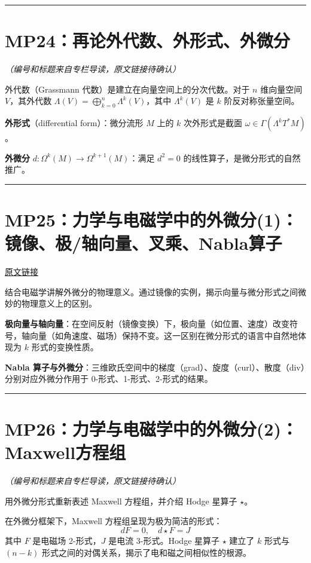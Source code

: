 \documentclass[10pt, openany]{book}
\begin{document}
\medskip
\noindent\rule{\textwidth}{0.4pt}

\section{MP24：再论外代数、外形式、外微分}
\label{sec:mp24}

\textit{（编号和标题来自专栏导读，原文链接待确认）}

外代数（Grassmann 代数）是建立在向量空间上的分次代数。对于 $n$ 维向量空间 $V$，其外代数 $\Lambda(V) = \bigoplus_{k=0}^n \Lambda^k(V)$，其中 $\Lambda^k(V)$ 是 $k$ 阶反对称张量空间。

\textbf{外形式}（differential form）：微分流形 $M$ 上的 $k$ 次外形式是截面 $\omega \in \Gamma(\Lambda^k T^*M)$。

\textbf{外微分} $d: \Omega^k(M) \to \Omega^{k+1}(M)$：满足 $d^2 = 0$ 的线性算子，是微分形式的自然推广。

\medskip
\noindent\rule{\textwidth}{0.4pt}

\section{MP25：力学与电磁学中的外微分(1)：镜像、极/轴向量、叉乘、Nabla算子}
\label{sec:mp25}

\href{https://zhuanlan.zhihu.com/p/45777678}{原文链接}

结合电磁学讲解外微分的物理意义。通过镜像的实例，揭示向量与微分形式之间微妙的物理意义上的区别。

\textbf{极向量与轴向量}：在空间反射（镜像变换）下，极向量（如位置、速度）改变符号，轴向量（如角速度、磁场）保持不变。这一区别在微分形式的语言中自然地体现为 $k$ 形式的变换性质。

\textbf{Nabla 算子与外微分}：三维欧氏空间中的梯度（grad）、旋度（curl）、散度（div）分别对应外微分作用于 0-形式、1-形式、2-形式的结果。

\medskip
\noindent\rule{\textwidth}{0.4pt}

\section{MP26：力学与电磁学中的外微分(2)：Maxwell方程组}
\label{sec:mp26}

\textit{（编号和标题来自专栏导读，原文链接待确认）}

用外微分形式重新表述 Maxwell 方程组，并介绍 Hodge 星算子 $\star$。

在外微分框架下，Maxwell 方程组呈现为极为简洁的形式：
\[
dF = 0, \quad d{\star}F = J
\]
其中 $F$ 是电磁场 2-形式，$J$ 是电流 3-形式。Hodge 星算子 $\star$ 建立了 $k$ 形式与 $(n-k)$ 形式之间的对偶关系，揭示了电和磁之间相似性的根源。
\end{document}
